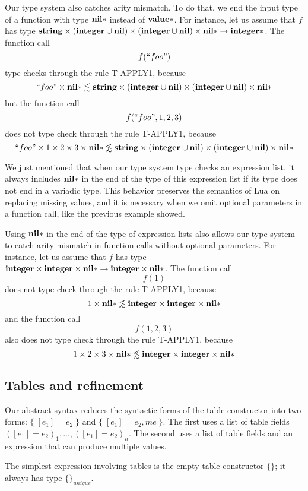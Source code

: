 Our type system also catches arity mismatch.
To do that, we end the input type of a function with type $\mathbf{nil}{*}$
instead of $\mathbf{value}{*}$.
For instance, let us assume that $f$ has type
$\mathbf{string} \times (\mathbf{integer} \cup \mathbf{nil}) \times (\mathbf{integer} \cup \mathbf{nil}) \times \mathbf{nil}{*} \rightarrow \mathbf{integer}{*}$.
The function call
\[
f(``foo")
\]
type checks through the rule \textsc{T-APPLY1}, because
\[
``foo" \times \mathbf{nil}{*} \lesssim \mathbf{string} \times (\mathbf{integer} \cup \mathbf{nil}) \times (\mathbf{integer} \cup \mathbf{nil}) \times \mathbf{nil}{*}
\]
but the function call
\[
f(``foo",1,2,3)
\]
does not type check through the rule \textsc{T-APPLY1}, because
\[
``foo" \times 1 \times 2 \times 3 \times \mathbf{nil}{*} \not\lesssim \mathbf{string} \times (\mathbf{integer} \cup \mathbf{nil}) \times (\mathbf{integer} \cup \mathbf{nil}) \times \mathbf{nil}{*}
\]

We just mentioned that when our type system type checks an expression list,
it always includes $\mathbf{nil}{*}$ in the end of the type of this expression list
if its type does not end in a variadic type.
This behavior preserves the semantics of Lua on replacing missing values,
and it is necessary when we omit optional parameters in a function call,
like the previous example showed.

Using $\mathbf{nil}{*}$ in the end of the type of expression lists also allows
our type system to catch arity mismatch in function calls without optional parameters.
For instance, let us assume that $f$ has type
$\mathbf{integer} \times \mathbf{integer} \times \mathbf{nil}{*} \rightarrow \mathbf{integer} \times \mathbf{nil}{*}$.
The function call
\[
f(1)
\]
does not type check through the rule \textsc{T-APPLY1}, because
\[
1 \times \mathbf{nil}{*} \not\lesssim \mathbf{integer} \times \mathbf{integer} \times \mathbf{nil}{*}
\]
and the function call
\[
f(1,2,3)
\]
also does not type check through the rule \textsc{T-APPLY1}, because
\[
1 \times 2 \times 3 \times \mathbf{nil}{*} \not\lesssim \mathbf{integer} \times \mathbf{integer} \times \mathbf{nil}{*}
\]

\subsection*{Tables and refinement}
\label{sec:refinement}

Our abstract syntax reduces the syntactic forms of the table constructor
into two forms: $\{\;\overline{[e_{1}] = e_{2}}\;\}$ and
$\{\;\overline{[e_{1}] = e_{2}},me\;\}$.
The first uses a list of table fields $([e_{1}] = e_{2})_{1}, ..., ([e_{1}] = e_{2})_{n}$.
The second uses a list of table fields and an expression that can
produce multiple values.

The simplest expression involving tables is the empty table constructor $\{\}$;
it always has type $\{\}_{unique}$.

